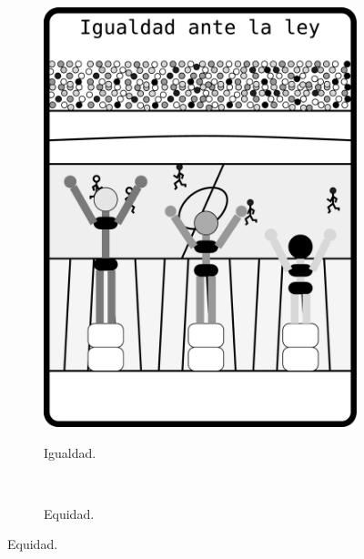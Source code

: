 \begin{figure}[ht!]
    \centering
    \begin{subfigure}{0.3\textwidth}
        \caption{Igualdad.}
        \includegraphics[width=\textwidth]{caps/desigualdad/igualdad.eps}
        \label{fig:igualdad}
    \end{subfigure}
    ~ %
    \begin{subfigure}{0.3\textwidth}
        \caption{Equidad.}

\end{subfigure}
\end{figure}
